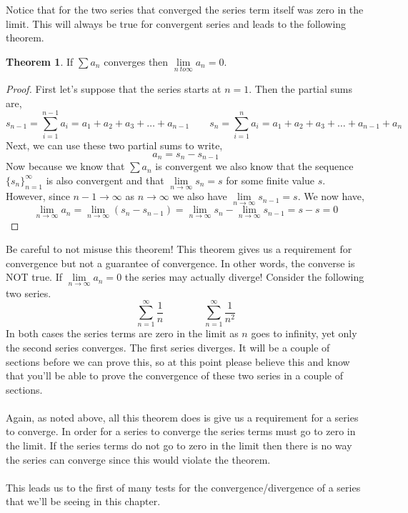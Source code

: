 \documentclass[10pt,reqno]{book}
\theoremstyle{definition}
\newtheorem{theorem}{Theorem}[section]
\begin{document}
	Notice that for the two series that converged the series term itself was zero in the limit. This will always be true for convergent series and leads to the following theorem.
	\begin{theorem}
		If $ \sum a_n $ converges then $ \lim\limits_{n\ to \infty} a_n = 0 $.
	\end{theorem}
	\begin{proof}
		First let's suppose that the series starts at $ n=1 $. Then the partial sums are,
		\[ s_{n-1} = \sum\limits_{i=1}^{n-1} a_i = a_1 + a_2 + a_3 + \ldots + a_{n-1} \qquad s_{n} = \sum\limits_{i=1}^{n} a_i = a_1 + a_2 + a_3 + \ldots + a_{n-1} + a_n \]
		Next, we can use these two partial sums to write,
		\[ a_n = s_n - s_{n-1} \]
		Now because we know that $ \sum a_n $ is convergent we also know that the sequence $ \{ s_n \}_{n=1}^{\infty} $ is also convergent and that $ \lim\limits_{n \to \infty} s_n =s $ for some finite value $ s $. However, since $ n-1 \to \infty $ as $ n \to \infty $ we also have $ \lim\limits_{n \to \infty} s_{n-1} = s $. We now have,
		\[ \lim\limits_{n \to \infty} a_n = \lim\limits_{n \to \infty} (s_n - s_{n-1}) = \lim\limits_{n \to \infty} s_n - \lim\limits_{n \to \infty} s_{n-1} = s-s = 0 \]
	\end{proof}
	\noindent Be careful to not misuse this theorem! This theorem gives us a requirement for convergence but not a guarantee of convergence.  In other words, the converse is NOT true. If $ \lim\limits_{n \to \infty} a_n = 0 $ the series may actually diverge! Consider the following two series.
	\[ \sum\limits_{n=1}^{\infty} \frac{1}{n} \qquad \qquad \sum\limits_{n=1}^{\infty} \frac{1}{n^2} \]
	In both cases the series terms are zero in the limit as $ n $ goes to infinity, yet only the second series converges. The first series diverges. It will be a couple of sections before we can prove this, so at this point please believe this and know that you'll be able to prove the convergence of these two series in a couple of sections.\\ \\
	Again, as noted above, all this theorem does is give us a requirement for a series to converge. In order for a series to converge the series terms must go to zero in the limit. If the series terms do not go to zero in the limit then there is no way the series can converge since this would violate the theorem.\\ \\
	This leads us to the first of many tests for the convergence/divergence of a series that we'll be seeing in this chapter.\\ \\
\end{document}
